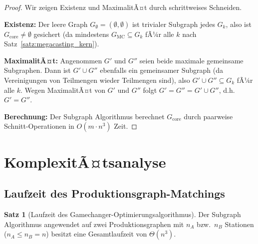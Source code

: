 ﻿\documentclass[a4paper,12pt]{article}
\theoremstyle{definition}
\newtheorem{satz}{Satz}
\begin{document}
\begin{proof}
Wir zeigen Existenz und MaximalitÃ¤t durch schrittweises Schneiden.

\textbf{Existenz:} Der leere Graph $G_\emptyset = (\emptyset, \emptyset)$ ist trivialer
Subgraph jedes $G_k$, also ist $G_{\mathrm{core}} \neq \emptyset$ gesichert
(da mindestens $G_{\mathrm{MC}} \subseteq G_k$ fÃ¼r alle $k$ nach Satz~\ref{satz:megacasting_kern}).

\textbf{MaximalitÃ¤t:} Angenommen $G'$ und $G''$ seien beide maximale gemeinsame Subgraphen.
Dann ist $G' \cup G''$ ebenfalls ein gemeinsamer Subgraph (da Vereinigungen von Teilmengen
wieder Teilmengen sind), also $G' \cup G'' \subseteq G_k$ fÃ¼r alle $k$.
Wegen MaximalitÃ¤t von $G'$ und $G''$ folgt $G' = G'' = G' \cup G''$, d.h.\ $G' = G''$.

\textbf{Berechnung:} Der Subgraph Algorithmus berechnet $G_{\mathrm{core}}$ durch paarweise
Schnitt-Operationen in $O(m \cdot n^3)$ Zeit.
\end{proof}

\section{KomplexitÃ¤tsanalyse}

\subsection{Laufzeit des Produktionsgraph-Matchings}

\begin{satz}[Laufzeit des Gamechanger-Optimierungsalgorithmus]
\label{satz:laufzeit}
Der Subgraph Algorithmus angewendet auf zwei Produktionsgraphen mit $n_A$ bzw.\ $n_B$
Stationen ($n_A \leq n_B = n$) besitzt eine Gesamtlaufzeit von $\Theta(n^3)$.
\end{satz}
\end{document}

